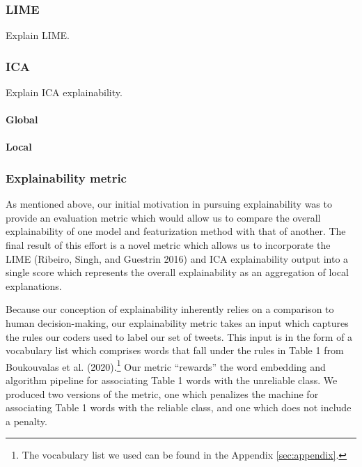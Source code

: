 \documentclass{article}
\begin{document}
\hypertarget{lime}{%
\subsubsection{LIME}\label{lime}}

Explain LIME.

\hypertarget{ica}{%
\subsubsection{ICA}\label{ica}}

Explain ICA explainability.

\hypertarget{global}{%
\paragraph{Global}\label{global}}

\hypertarget{local}{%
\paragraph{Local}\label{local}}

\hypertarget{explainability-metric}{%
\subsubsection{Explainability metric}\label{explainability-metric}}

As mentioned above, our initial motivation in pursuing explainability
was to provide an evaluation metric which would allow us to compare the
overall explainability of one model and featurization method with that
of another. The final result of this effort is a novel metric which
allows us to incorporate the LIME (Ribeiro, Singh, and Guestrin 2016)
and ICA explainability output into a single score which represents the
overall explainability as an aggregation of local explanations.

Because our conception of explainability inherently relies on a
comparison to human decision-making, our explainability metric takes an
input which captures the rules our coders used to label our set of
tweets. This input is in the form of a vocabulary list which comprises
words that fall under the rules in Table 1 from Boukouvalas et al.
(2020).\footnote{The vocabulary list we used can be found in the
  Appendix \ref{sec:appendix}.} Our metric ``rewards'' the word
embedding and algorithm pipeline for associating Table 1 words with the
unreliable class. We produced two versions of the metric, one which
penalizes the machine for associating Table 1 words with the reliable
class, and one which does not include a penalty.
\end{document}
